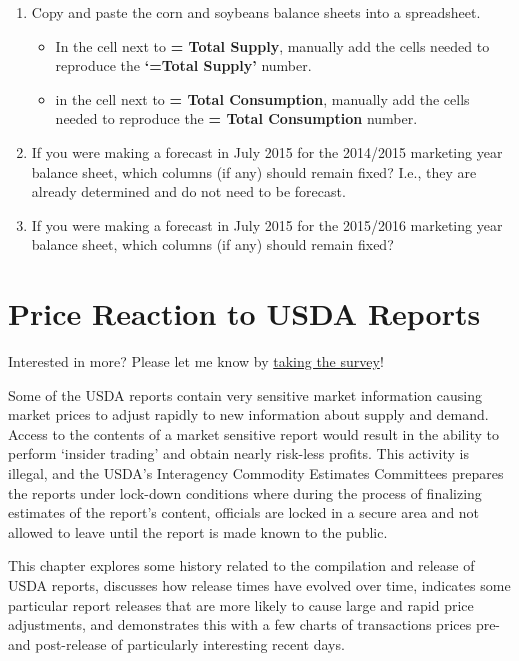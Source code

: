 \documentclass[
  letterpaper,
  DIV=11,
  numbers=noendperiod]{scrreprt}
\providecommand{\tightlist}{%
  \setlength{\itemsep}{0pt}\setlength{\parskip}{0pt}}\usepackage{longtable,booktabs,array}
\begin{document}
\begin{enumerate}
\def\labelenumi{\arabic{enumi}.}
\item
  Copy and paste the corn and soybeans balance sheets into a
  spreadsheet.

  \begin{itemize}
  \tightlist
  \item
    In the cell next to \textbf{= Total Supply}, manually add the cells
    needed to reproduce the \textbf{`=Total Supply'} number.
  \item
    in the cell next to \textbf{= Total Consumption}, manually add the
    cells needed to reproduce the \textbf{= Total Consumption} number.
  \end{itemize}
\item
  If you were making a forecast in July 2015 for the 2014/2015 marketing
  year balance sheet, which columns (if any) should remain fixed? I.e.,
  they are already determined and do not need to be forecast.
\item
  If you were making a forecast in July 2015 for the 2015/2016 marketing
  year balance sheet, which columns (if any) should remain fixed?
\end{enumerate}


\hypertarget{price-reaction-to-usda-reports}{%
\chapter{Price Reaction to USDA
Reports}\label{price-reaction-to-usda-reports}}

{Interested in more? Please let me know by}
\href{https://forms.gle/Q3VByCQZHjfQSy9D7}{taking the survey}!

Some of the USDA reports contain very sensitive market information
causing market prices to adjust rapidly to new information about supply
and demand. Access to the contents of a market sensitive report would
result in the ability to perform `insider trading' and obtain nearly
risk-less profits. This activity is illegal, and the USDA's Interagency
Commodity Estimates Committees prepares the reports under lock-down
conditions where during the process of finalizing estimates of the
report's content, officials are locked in a secure area and not allowed
to leave until the report is made known to the public.

This chapter explores some history related to the compilation and
release of USDA reports, discusses how release times have evolved over
time, indicates some particular report releases that are more likely to
cause large and rapid price adjustments, and demonstrates this with a
few charts of transactions prices pre- and post-release of particularly
interesting recent days.
\end{document}
